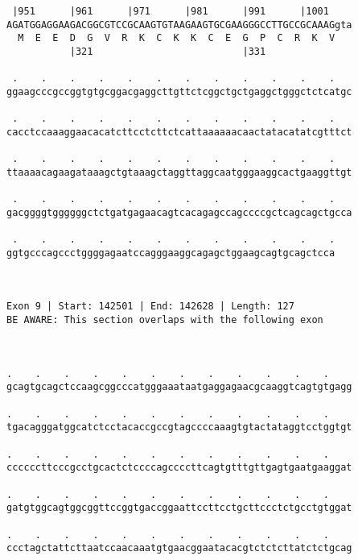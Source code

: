 \documentclass{article}
\begin{document}
\begin{Verbatim}
 |951      |961      |971      |981      |991      |1001    
AGATGGAGGAAGACGGCGTCCGCAAGTGTAAGAAGTGCGAAGGGCCTTGCCGCAAAGgta
  M  E  E  D  G  V  R  K  C  K  K  C  E  G  P  C  R  K  V   
           |321                          |331               
  
 .    .    .    .    .    .    .    .    .    .    .    .   
ggaagcccgccggtgtgcggacgaggcttgttctcggctgctgaggctgggctctcatgc
                                                            
 .    .    .    .    .    .    .    .    .    .    .    .   
cacctccaaaggaacacatcttcctcttctcattaaaaaacaactatacatatcgtttct
                                                            
 .    .    .    .    .    .    .    .    .    .    .    .   
ttaaaacagaagataaagctgtaaagctaggttaggcaatgggaaggcactgaaggttgt
                                                            
 .    .    .    .    .    .    .    .    .    .    .    .   
gacggggtggggggctctgatgagaacagtcacagagccagccccgctcagcagctgcca
                                                            
 .    .    .    .    .    .    .    .    .    .    .    .
ggtgcccagccctggggagaatccagggaaggcagagctggaagcagtgcagctcca
                                                         
                                                         
 
Exon 9 | Start: 142501 | End: 142628 | Length: 127
BE AWARE: This section overlaps with the following exon



.    .    .    .    .    .    .    .    .    .    .    .    
gcagtgcagctccaagcggcccatgggaaataatgaggagaacgcaaggtcagtgtgagg
                                                            
.    .    .    .    .    .    .    .    .    .    .    .    
tgacagggatggcatctcctacaccgccgtagccccaaagtgtactataggtcctggtgt
                                                            
.    .    .    .    .    .    .    .    .    .    .    .    
ccccccttcccgcctgcactctccccagccccttcagtgtttgttgagtgaatgaaggat
                                                            
.    .    .    .    .    .    .    .    .    .    .    .    
gatgtggcagtggcggttccggtgaccggaattccttcctgcttccctctgcctgtggat
                                                            
.    .    .    .    .    .    .    .    .    .    .    .    
ccctagctattcttaatccaacaaatgtgaacggaatacacgtctctcttatctctgcag
                                                            

\end{Verbatim}
\end{document}
